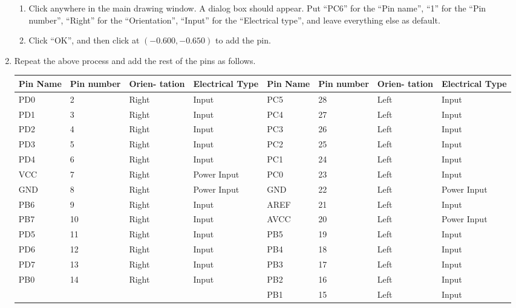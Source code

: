 \documentclass[12pt,letterpaper]{scrartcl}
\begin{document}
\begin{enumerate}
\begin{enumerate}
			\item Click anywhere in the main drawing window. A dialog box should appear. Put ``PC6'' for the ``Pin name'', ``1'' for the ``Pin number'', ``Right'' for the ``Orientation'', ``Input'' for the ``Electrical type'', and leave everything else as default. 
			
			\item Click ``OK'', and then click at $(-0.600, -0.650)$ to add the pin. 
		\end{enumerate}

	\item Repeat the above process and add the rest of the pins as follows. 
		\begin{table}[hp]
			\centering
			\begin{tabular}{|p{0.5in}|p{0.5in}|p{0.5in}|p{1in}||p{0.5in}|p{0.5in}|p{0.5in}|p{1in}|}
				\hline  \bf Pin Name & \bf Pin number & \bf Orien- tation & \bf Electrical Type & \bf Pin Name & \bf Pin number & \bf Orien- tation & \bf Electrical Type\\ 
				\hline \hline PD0 & 2 & Right & Input & PC5 & 28 & Left & Input\\ 
				\hline PD1 & 3 & Right & Input & PC4 & 27 & Left & Input\\ 
				\hline PD2 & 4 & Right & Input & PC3 & 26 & Left & Input \\ 
				\hline PD3 & 5 & Right & Input & PC2 & 25 & Left & Input\\ 
				\hline PD4 & 6 & Right & Input & PC1 & 24 & Left & Input\\ 
				\hline VCC & 7 & Right & Power Input & PC0 & 23 & Left & Input\\ 
				\hline GND & 8 & Right & Power Input & GND & 22 & Left & Power Input\\ 
				\hline PB6 & 9 & Right & Input & AREF & 21 & Left & Input\\ 
				\hline PB7 & 10 & Right & Input & AVCC & 20 & Left & Power Input\\ 
				\hline PD5 & 11 & Right & Input & PB5 & 19 & Left & Input\\ 
				\hline PD6 & 12 & Right & Input & PB4 & 18 & Left & Input\\ 
				\hline PD7 & 13 & Right & Input & PB3 & 17 & Left & Input\\ 
				\hline PB0 & 14 & Right & Input & PB2 & 16 & Left & Input\\ 
				\hline & & & & PB1 & 15 & Left & Input\\
				\hline 
			\end{tabular} 
		\end{table}
	

\end{enumerate}
\end{document}
